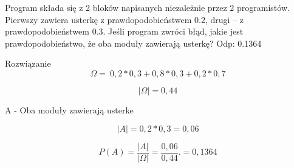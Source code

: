 \medskip
{} 
\medskip

Program składa się z 2 bloków napisanych niezależnie przez 2 programistów. Pierwszy zawiera usterkę z prawdopodobieństwem 0.2, drugi -- z prawdopodobieństwem 0.3. Jeśli program zwróci błąd, jakie jest prawdopodobieństwo, że oba moduły zawierają usterkę? Odp: 0.1364

Rozwiązanie
$$
\Omega=\  0,2 * 0,3 + 0,8 * 0,3 + 0,2 * 0,7
$$

$$
|\Omega|=0,44
$$

A - Oba moduły zawierają usterke

$$
|A|=0,2 * 0,3 = 0,06
$$

$$
P(A)=\frac{|A|}{|\Omega|}=\frac{0,06}{0,44}. = 0,1364
$$
